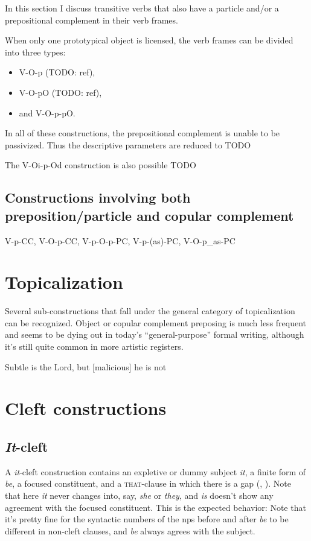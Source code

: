 \documentclass[UTF8, a4paper, oneside, scheme=plain, 12pt]{ctexbook}
\newcommand{\form}[1]{\emph{#1}}
\newcommand{\formcat}[1]{\textsc{#1}}
\begin{document}
In this section I discuss 
transitive verbs that also have a particle and/or a prepositional complement 
in their verb frames.

When only one prototypical object is licensed,
the verb frames can be divided into three types:
\begin{itemize}
    \item V-O-p (TODO: ref),
    \item V-O-pO (TODO: ref), 
    \item and V-O-p-pO.
\end{itemize}
In all of these constructions, 
the prepositional complement is unable to be passivized.
Thus the descriptive parameters are reduced to TODO 

The V-Oi-p-Od construction is also possible TODO 

\subsection{Constructions involving both preposition/particle and copular complement}

V-p-CC, V-O-p-CC, V-p-O-p-PC, V-p-(as)-PC, V-O-p_as-PC


\section{Topicalization}\label{sec:simple-clause.information.topicalization}

Several sub-constructions that fall under the general category of topicalization can be recognized.
Object or copular complement preposing is much less frequent 
and seems to be dying out in today's ``general-purpose'' formal writing, 
although it's still quite common in more artistic registers. 

\begin{exe}
    \ex Subtle is the Lord, but [malicious] he is not
\end{exe}

\section{Cleft constructions}

\subsection{\form{It}-cleft}

A \form{it}-cleft construction 
contains an expletive or dummy subject \form{it},
a finite form of \form{be}, 
a focused constituent,
and a \formcat{that}-clause in which there is a gap
(, ).
Note that here \form{it} never changes into, say, \form{she} or \form{they},
and \form{is} doesn't show any agreement with the focused constituent.
This is the expected behavior: 
Note that it's pretty fine 
for the syntactic numbers of the \acs{np}s 
before and after \form{be} to be different
in non-cleft clauses, 
and \form{be} always agrees with the subject.
\end{document}
